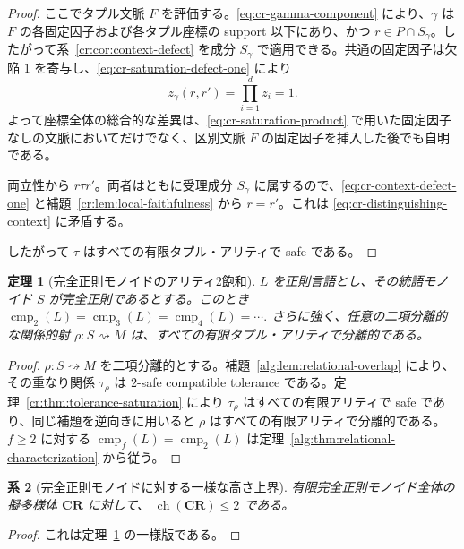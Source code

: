\documentclass[10pt,a4paper]{ltjsarticle}
\newtheorem{theorem}{定理}[section]
\newtheorem{corollary}[theorem]{系}
\theoremstyle{definition}
\theoremstyle{remark}
\newcommand{\cmp}{\operatorname{cmp}}
\newcommand{\relto}{\mathrel{\rightsquigarrow}}
\begin{document}
\begin{proof}
ここでタプル文脈 $F$ を評価する。\eqref{eq:cr-gamma-component} により、$\gamma$ は $F$ の各固定因子および各タプル座標の support 以下にあり、かつ $r\in P\cap S_\gamma$。したがって系~\ref{cr:cor:context-defect} を成分 $S_\gamma$ で適用できる。共通の固定因子は欠陥 $1$ を寄与し、\eqref{eq:cr-saturation-defect-one} により
\begin{equation}
z_\gamma(r,r')
=
\prod_{i=1}^d z_i
=
1.
\label{eq:cr-context-defect-one}
\end{equation}
よって座標全体の総合的な差異は、\eqref{eq:cr-saturation-product} で用いた固定因子なしの文脈においてだけでなく、区別文脈 $F$ の固定因子を挿入した後でも自明である。

両立性から \(r\tau r'\)。両者はともに受理成分 $S_\gamma$ に属するので、\eqref{eq:cr-context-defect-one} と補題~\ref{cr:lem:local-faithfulness} から $r=r'$。これは \eqref{eq:cr-distinguishing-context} に矛盾する。

したがって $\tau$ はすべての有限タプル・アリティで safe である。
\end{proof}

\begin{theorem}[完全正則モノイドのアリティ2飽和]
\label{cr:thm:arity-two-saturation}
$L$ を正則言語とし、その統語モノイド $S$ が完全正則であるとする。このとき
\(\cmp_2(L)=\cmp_3(L)=\cmp_4(L)=\cdots.\)
さらに強く、任意の二項分離的な関係的射
$\rho:S\relto M$
は、すべての有限タプル・アリティで分離的である。
\end{theorem}

\begin{proof}
\(\rho:S\relto M\) を二項分離的とする。補題~\ref{alg:lem:relational-overlap} により、その重なり関係 \(\tau_\rho\) は $2$-safe compatible tolerance である。定理~\ref{cr:thm:tolerance-saturation} により \(\tau_\rho\) はすべての有限アリティで safe であり、同じ補題を逆向きに用いると \(\rho\) はすべての有限アリティで分離的である。$f\ge2$ に対する
\(\cmp_f(L)=\cmp_2(L)\)
は定理~\ref{alg:thm:relational-characterization} から従う。
\end{proof}

\begin{corollary}[完全正則モノイドに対する一様な高さ上界]
\label{cr:cor:height-upper}
有限完全正則モノイド全体の擬多様体 \(\mathbf{CR}\) に対して、
\(\operatorname{ch}(\mathbf{CR})\le 2\)
である。
\end{corollary}

\begin{proof}
これは定理~\ref{cr:thm:arity-two-saturation} の一様版である。
\end{proof}
\end{document}

